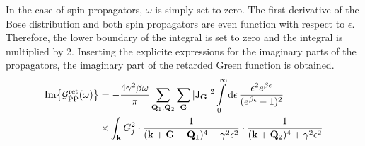 In the case of spin propagators, $\omega$ is simply set to zero.
The first derivative of the Bose distribution and both spin propagators are even function with respect to $\epsilon$.
Therefore, the lower boundary of the integral is set to zero and the integral is multiplied by 2.
Inserting the explicite expressions for the imaginary parts of the propagators, the imaginary part of the retarded Green function is obtained.
%
\begin{align}
	\Im{\mathcal{G}_{\dot{\mathrm{P}}\dot{\mathrm{P}}}^{\mathrm{ret}}(\omega)} &= 
		-\frac{4 \gamma^{2} \beta \omega}{\pi}
		\sum\limits_{\vb{Q}_{1}, \vb{Q}_{2}}
		\sum\limits_{\vb{G}}
		\vert \mathrm{J}_{\vb{G}} \vert^{2}
		\int\limits_{0}^{\infty} \dd{\epsilon}
		\frac{\epsilon^{2} e^{\beta \epsilon}}{(e^{\beta \epsilon} - 1)^{2}}
		\notag \\
		&\times
		\int_{\vb{k}} G_{j}^{2} \cdot
		\frac{1}{(\vb{k}+\vb{G}-\vb{Q}_{1})^{4} + \gamma^{2} \epsilon^{2}} \cdot
		\frac{1}{(\vb{k} + \vb{Q}_{2})^{4} + \gamma^{2} \epsilon^{2}}
		\label{appeq:imaginary part Green function on the real axis}
\end{align}
%

























